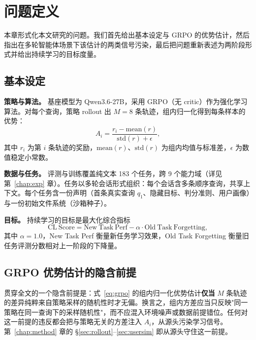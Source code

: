 \chapter{问题定义}
\label{chap:setup}

本章形式化本文研究的问题。我们首先给出基本设定与 GRPO 的优势估计，然后指出在多轮智能体场景下该估计的两类信号污染，最后把问题重新表述为两阶段形式并给出持续学习的目标度量。

\section{基本设定}
\label{sec:setup-basic}

\textbf{策略与算法。} 基座模型为 Qwen3.6-27B，采用 GRPO（无 critic）作为强化学习算法。对每个查询，策略 rollout 出 $M=8$ 条轨迹，组内归一化得到每条样本的优势：
\begin{equation}
\label{eq:grpo}
A_i = \frac{r_i - \mathrm{mean}(r)}{\mathrm{std}(r) + \epsilon},
\end{equation}
其中 $r_i$ 为第 $i$ 条轨迹的奖励，$\mathrm{mean}(r)$、$\mathrm{std}(r)$ 为组内均值与标准差，$\epsilon$ 为数值稳定小常数。

\textbf{数据与任务。} 评测与训练覆盖纯文本 183 个任务，跨 9 个能力域（详见第~\ref{chap:exp} 章）。任务以多轮会话形式组织：每个会话含多条顺序查询，共享上下文。每个任务含一份声明（首条真实查询 $q_1$、隐藏目标、判分准则、用户画像）与一份初始文件系统（沙箱种子）。

\textbf{目标。} 持续学习的目标是最大化综合指标
\begin{equation}
\label{eq:clscore}
\mathrm{CL\ Score} = \mathrm{New\ Task\ Perf} - \alpha \cdot \mathrm{Old\ Task\ Forgetting},
\end{equation}
其中 $\alpha=1.0$，New Task Perf 衡量新任务学习效果，Old Task Forgetting 衡量旧任务评测分数相对上一阶段的下降量。

\section{GRPO 优势估计的隐含前提}
\label{sec:setup-premise}

贯穿全文的一个隐含前提是：式~\eqref{eq:grpo} 的组内归一化优势估计\textbf{仅当} $M$ 条轨迹的差异纯粹来自策略采样的随机性时才无偏。换言之，组内方差应当只反映"同一策略在同一查询下的采样随机性"，而不应混入环境噪声或数据前提错位。任何对这一前提的违反都会把与策略无关的方差注入 $A_i$，从源头污染学习信号。第~\ref{chap:method} 章的 \S\ref{sec:rollout}--\ref{sec:usersim} 即从源头守住这一前提。

